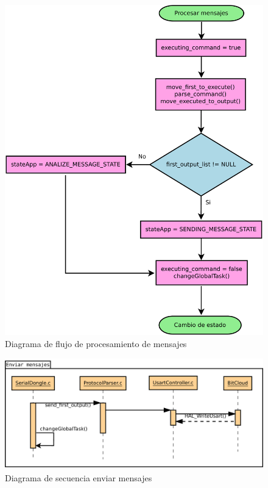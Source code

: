 \begin{figure}
	\centering
	\includegraphics[scale=0.35]{capitulo_3_imgs/procesar_mensaje_flujo.pdf}
	\caption{Diagrama de flujo de procesamiento de mensajes}
	\label{fig:diagrama_flujo_procesamiento}
\end{figure}

\begin{figure}
	\centering
	\includegraphics[scale=0.35]{capitulo_3_imgs/enviar_mensajes_secuencia.pdf}
	\caption{Diagrama de secuencia enviar mensajes}
	\label{fig:diagrama_enviar_secuencia}
\end{figure}






